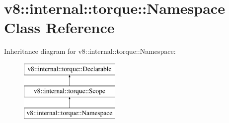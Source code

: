 \hypertarget{classv8_1_1internal_1_1torque_1_1Namespace}{}\section{v8\+:\+:internal\+:\+:torque\+:\+:Namespace Class Reference}
\label{classv8_1_1internal_1_1torque_1_1Namespace}
Inheritance diagram for v8\+:\+:internal\+:\+:torque\+:\+:Namespace\+:\begin{figure}[H]
\begin{center}
\leavevmode
\includegraphics[height=3.000000cm]{classv8_1_1internal_1_1torque_1_1Namespace}
\end{center}
\end{figure}
